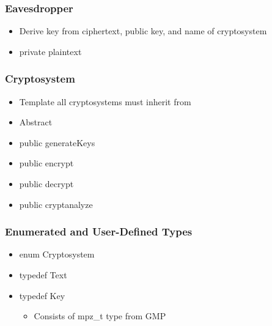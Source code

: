 
\begin{frame}
\frametitle{Eavesdropper}
\begin{itemize}
  \item Derive key from ciphertext, public key, and name of cryptosystem
  \item private plaintext
\end{itemize}
\end{frame}


\begin{frame}
\frametitle{Cryptosystem}
\begin{itemize}
  \item Template all cryptosystems must inherit from
  \item Abstract
  \item public generateKeys
  \item public encrypt
  \item public decrypt
  \item public cryptanalyze
\end{itemize}
\end{frame}


\begin{frame}
\frametitle{Enumerated and User-Defined Types}
\begin{itemize}
  \item enum Cryptosystem
  \item typedef Text
  \item typedef Key
  \begin{itemize}
    \item Consists of mpz\_t type from GMP
  \end{itemize}
\end{itemize}
\end{frame}

